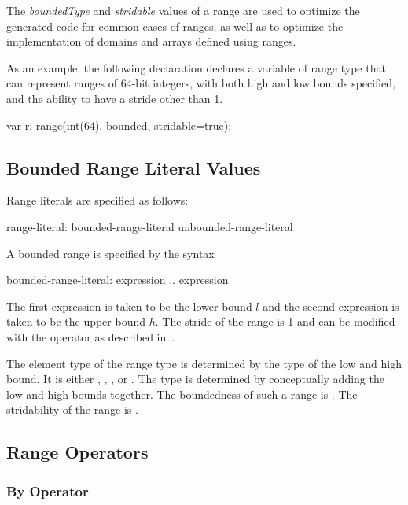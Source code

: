 \begin{rationale}
The \emph{boundedType} and \emph{stridable} values of a range are used
to optimize the generated code for common cases of ranges, as well as
to optimize the implementation of domains and arrays defined using
ranges.
\end{rationale}

\begin{example}
As an example, the following declaration declares a variable 
of range type that can represent ranges of 64-bit integers, with both
high and low bounds specified, and the ability to have a stride other
than 1.
\begin{chapel}
var r: range(int(64), bounded, stridable=true);
\end{chapel}
\end{example}

\subsection{Bounded Range Literal Values}

Range literals are specified as follows:
\begin{syntax}
range-literal:
  bounded-range-literal
  unbounded-range-literal
\end{syntax}

A bounded range is specified by the syntax
\begin{syntax}
bounded-range-literal:
  expression .. expression
\end{syntax}
The first expression is taken to be the lower bound $l$ and the second
expression is taken to be the upper bound $h$.  The stride of the
range is 1 and can be modified with the  operator as described
in~.

The element type of the range type is determined by the type of the
low and high bound.  It is either , ,
, or .  The type is determined by
conceptually adding the low and high bounds together.  The boundedness
of such a range is .  The stridability of the range is
.

\subsection{Range Operators}

\subsubsection{By Operator}
\label{Strided_Ranges}

